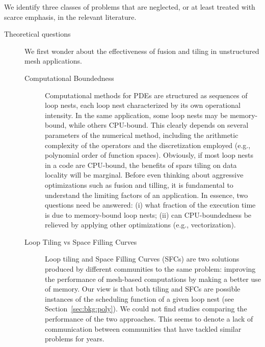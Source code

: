 We identify three classes of problems that are neglected, or at least treated with scarce emphasis, in the relevant literature. 

\begin{description}
\item[Theoretical questions] We first wonder about the effectiveness of fusion and tiling in unstructured mesh applications.

\begin{description}
\item[Computational Boundedness] Computational methods for PDEs are structured as sequences of loop nests, each loop nest characterized by its own operational intensity. In the same application, some loop nests may be memory-bound, while others CPU-bound. This clearly depends on several parameters of the numerical method, including the arithmetic complexity of the operators and the discretization employed (e.g., polynomial order of function spaces). Obviously, if most loop nests in a code are CPU-bound, the benefits of spars tiling on data locality will be marginal. Before even thinking about aggressive optimizations such as fusion and tilling, it is fundamental to understand the limiting factors of an application. In essence, two questions need be answered: (i) what fraction of the execution time is due to memory-bound loop nests; (ii) can CPU-boundedness be relieved by applying other optimizations (e.g., vectorization).
\item[Loop Tiling vs Space Filling Curves] Loop tiling and Space Filling Curves (SFCs) are two solutions produced by different communities to the same problem: improving the performance of mesh-based computations by making a better use of memory. Our view is that both tiling and SFCs are possible instances of the scheduling function of a given loop nest (see Section~\ref{sec:bkg:poly}). We could not find studies comparing the performance of the two approaches. This seems to denote a lack of communication between communities that have tackled similar problems for years.
\end{description}


\end{description}
